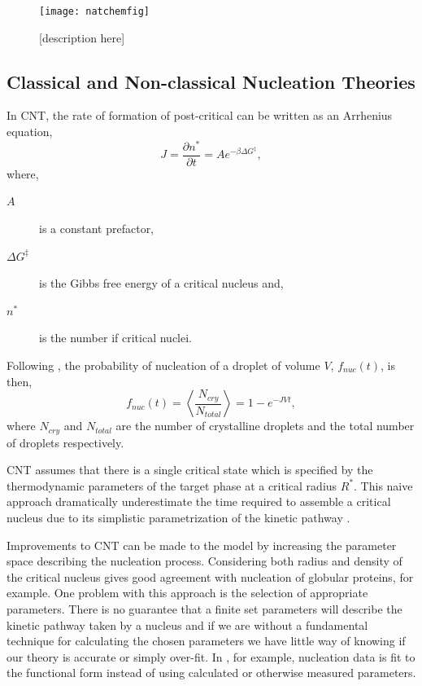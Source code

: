 \documentclass[showkeys, prb, reprint]{revtex4-1}
\newcommand{\f}{\frac}          %
\newcommand{\mean}[1]{\left\langle #1 \right\rangle}
\begin{document}
\begin{figure}
    \texttt{[image: natchemfig]}
    \caption{
        \label{loh_figure} [description here]
    }
\end{figure}



\subsection{Classical and Non-classical Nucleation Theories} %


In CNT, the rate of formation of post-critical can be written as an Arrhenius
equation,
%
\begin{equation}
    J = \f{\partial n^*}{\partial t} = A e^{-\beta\Delta G^{\ddagger}},
\end{equation}
where,
\begin{description}
    \item[$A$] is a constant prefactor,
    \item[$\Delta G^\ddagger$] is the Gibbs free energy of a critical nucleus
        and, 
    \item[$n^*$] is the number if critical nuclei.
\end{description}
% 
Following \cite{MYERSON04}, the probability of nucleation of a droplet of
volume $V$, $f_{nuc}(t)$, is then,
%
\begin{equation}
    f_{nuc}(t) = \mean{\f{N_{cry}}{N_{total}}} = 1 - e^{-J V t},
\end{equation}
%
where $N_{cry}$ and $N_{total}$ are the number of crystalline droplets and the
total number of droplets respectively.


CNT assumes that there is a single critical state which is specified by the
thermodynamic parameters of the target phase at a critical radius $R^*$. This
naive approach dramatically underestimate the time required to assemble a
critical nucleus due to its simplistic parametrization of the kinetic pathway
\cite{LUTSKO15, MYERSON04, MYERSON09}.

Improvements to CNT can be made to the model by increasing the parameter space
describing the nucleation process. Considering both radius and density of the
critical nucleus \cite{LUTSKO15} gives good agreement with nucleation of
globular proteins, for example. One problem with this approach is the selection
of appropriate parameters. There is no guarantee that a finite set parameters
will describe the kinetic pathway taken by a nucleus and if we are without a
fundamental technique for calculating the chosen parameters we have little way
of knowing if our theory is accurate or simply over-fit. In \cite{MYERSON09},
for example, nucleation data is fit to the functional form instead of using
calculated or otherwise measured parameters.
\end{document}
